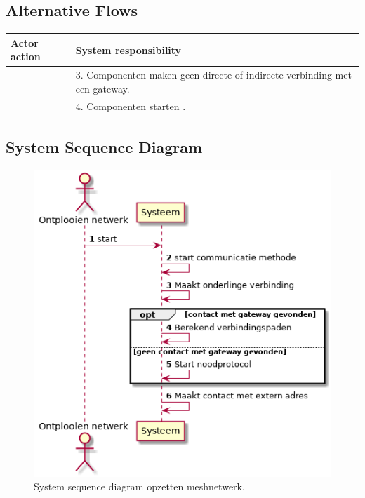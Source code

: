 \documentclass[a4paper, 11pt, oneside]{report}
\begin{document}
\subsection{Alternative Flows}


\begin{table}[H]
	\centering
	\begin{tabular}{|l|l|}
		\hline
		\rowcolor[HTML]{C0C0C0} 
		Actor action  & System responsibility   \\ \hline
		& 3. Componenten maken geen directe of indirecte verbinding met een gateway.\\ \hline
		& 4. Componenten starten \nameref{Usecase:noodprotocol}.      \\ \hline
	\end{tabular}
\end{table}

\label{Usecase:opbouwenmeshnetwerk:fully-dressed}
\subsection{System Sequence Diagram }
\label{Usecase:opbouwenmeshnetwerk:systemsequence}

\begin{figure}[H]
	\begin{center}\includegraphics[height=.3\textheight]{UML/out/usecase/sequence/meshnetwerk/meshnetwerk.png}\end{center}
	\caption{System sequence diagram opzetten meshnetwerk.}
	\label{fig:opbouwenmeshnetwerk:systemsequence}
\end{figure}
\end{document}
